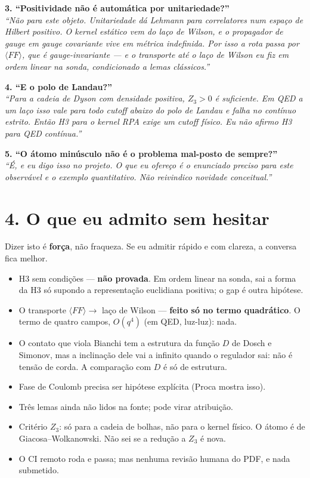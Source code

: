 \documentclass[12pt,a4paper]{article}
\newcommand{\fala}[1]{\textit{\color{ink}``#1''}}
\begin{document}
\textbf{3. ``Positividade não é automática por unitariedade?''}\\
\fala{Não para este objeto. Unitariedade dá Lehmann para correlatores num
espaço de Hilbert positivo. O kernel estático vem do laço de Wilson, e o
propagador de gauge em gauge covariante vive em métrica indefinida. Por isso a
rota passa por $\langle FF\rangle$, que é gauge-invariante --- e o transporte até
o laço de Wilson eu fiz em ordem linear na sonda, condicionado a lemas
clássicos.}

\textbf{4. ``E o polo de Landau?''}\\
\fala{Para a cadeia de Dyson com densidade positiva, $Z_3>0$ é suficiente.
Em QED a um laço isso vale para todo cutoff abaixo do polo de Landau e falha no
contínuo estrito. Então H3 para o kernel RPA exige um cutoff físico. Eu não
afirmo H3 para QED contínua.}

\textbf{5. ``O átomo minúsculo não é o problema mal-posto de sempre?''}\\
\fala{É, e eu digo isso no projeto. O que eu ofereço é o enunciado preciso para
este observável e o exemplo quantitativo. Não reivindico novidade conceitual.}

\section*{4. O que eu admito sem hesitar}

Dizer isto é \textbf{força}, não fraqueza. Se eu admitir rápido e com clareza,
a conversa fica melhor.

\begin{itemize}[leftmargin=6mm,itemsep=2pt]
\item H3 sem condições --- \textbf{não provada}. Em ordem linear na sonda, sai
a forma da H3 só supondo a representação euclidiana positiva; o gap é outra
hipótese.
\item O transporte $\langle FF\rangle\to$ laço de Wilson --- \textbf{feito só no
termo quadrático}. O termo de quatro campos, $O(q^4)$ (em QED, luz-luz): nada.
\item O contato que viola Bianchi tem a estrutura da função $D$ de Dosch e
Simonov, mas a inclinação dele vai a infinito quando o regulador sai: não é
tensão de corda. A comparação com $D$ é só de estrutura.
\item Fase de Coulomb precisa ser hipótese explícita (Proca mostra isso).
\item Três lemas ainda não lidos na fonte; pode virar atribuição.
\item Critério $Z_3$: só para a cadeia de bolhas, não para o kernel físico. O
átomo é de Giacosa--Wolkanowski. Não sei se a redução a $Z_3$ é nova.
\item O CI remoto roda e passa; mas nenhuma revisão humana do PDF, e nada
submetido.
\end{itemize}
\end{document}
